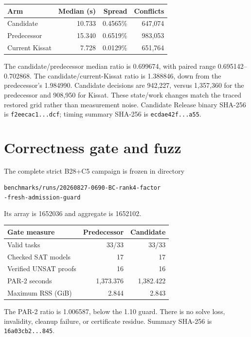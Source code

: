 \documentclass[11pt]{article}
\newcommand{\code}[1]{\texttt{#1}}
\begin{document}
\begin{center}
\begin{tabular}{@{}lrrr@{}}
\toprule
Arm & Median (s) & Spread & Conflicts \\
\midrule
Candidate & 10.733 & 0.4565\% & 647,074 \\
Predecessor & 15.340 & 0.6519\% & 983,053 \\
Current Kissat & 7.728 & 0.0129\% & 651,764 \\
\bottomrule
\end{tabular}
\end{center}

The candidate/predecessor median ratio is 0.699674, with paired range
0.695142--0.702868.  The candidate/current-Kissat ratio is 1.388846, down from
the predecessor's 1.984990.  Candidate decisions are 942,227, versus 1,357,360
for the predecessor and 908,950 for Kissat.  These state/work changes match the
traced restored grid rather than measurement noise.  Candidate Release binary
SHA-256 is \code{f2eecac1...dcf}; timing summary SHA-256 is
\code{ecdae42f...a55}.

\section{Correctness gate and fuzz}

The complete strict B28+C5 campaign is frozen in directory
\begin{center}
\small\code{benchmarks/runs/20260827-0690-BC-rank4-factor}\\
\code{-fresh-admission-guard}
\end{center}
Its array is 1652036 and aggregate is 1652102.

\begin{center}
\begin{tabular}{@{}lrr@{}}
\toprule
Gate measure & Predecessor & Candidate \\
\midrule
Valid tasks & 33/33 & 33/33 \\
Checked SAT models & 17 & 17 \\
Verified UNSAT proofs & 16 & 16 \\
PAR-2 seconds & 1,373.376 & 1,382.422 \\
Maximum RSS (GiB) & 2.844 & 2.843 \\
\bottomrule
\end{tabular}
\end{center}

The PAR-2 ratio is 1.006587, below the 1.10 guard.  There is no solve loss,
invalidity, cleanup failure, or certificate residue.  Summary SHA-256 is
\code{16a03cb2...845}.
\end{document}
